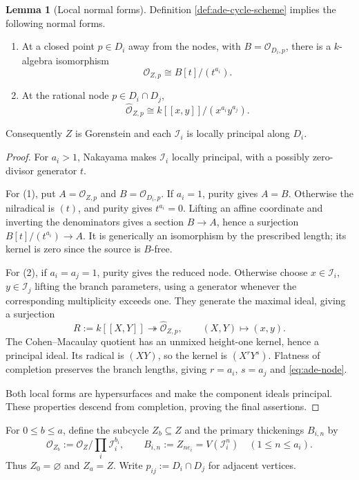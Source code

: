 \documentclass[a4paper,reqno]{amsart}
\def\I{\mathcal{I}}
\def\O{\mathcal{O}}
\theoremstyle{definition}
\newtheorem{Lem}[Thm]{Lemma}
\begin{document}
\begin{Lem}[Local normal forms]\label{lem:ade-local-structure}
Definition \ref{def:ade-cycle-scheme} implies the following normal forms.
\begin{enumerate}
\item At a closed point $p\in D_i$ away from the nodes, with $B=\O_{D_i,p}$, there is a $k$-algebra isomorphism
\[
\O_{Z,p}\cong B[t]/(t^{a_i}).
\]
\item At the rational node $p\in D_i\cap D_j$,
\begin{equation}\label{eq:ade-node}
\widehat{\O}_{Z,p}\cong k[[x,y]]/(x^{a_i}y^{a_j}).
\end{equation}
\end{enumerate}
Consequently $Z$ is Gorenstein and each $\I_i$ is locally principal along $D_i$.
\end{Lem}
\begin{proof}
For $a_i>1$, Nakayama makes $\I_i$ locally principal, with a possibly zero-divisor generator $t$.

For (1), put $A=\O_{Z,p}$ and $B=\O_{D_i,p}$. If $a_i=1$, purity gives $A=B$. Otherwise the nilradical is $(t)$, and purity gives $t^{a_i}=0$. Lifting an affine coordinate and inverting the denominators gives a section $B\to A$, hence a surjection $B[t]/(t^{a_i})\to A$. It is generically an isomorphism by the prescribed length; its kernel is zero since the source is $B$-free.

For (2), if $a_i=a_j=1$, purity gives the reduced node. Otherwise choose $x\in\I_i$, $y\in\I_j$ lifting the branch parameters, using a generator whenever the corresponding multiplicity exceeds one. They generate the maximal ideal, giving a surjection
\[
R:=k[[X,Y]]\twoheadrightarrow\widehat{\O}_{Z,p},
\qquad (X,Y)\longmapsto(x,y).
\]
The Cohen--Macaulay quotient has an unmixed height-one kernel, hence a principal ideal. Its radical is $(XY)$, so the kernel is $(X^rY^s)$. Flatness of completion preserves the branch lengths, giving $r=a_i$, $s=a_j$ and \eqref{eq:ade-node}.

Both local forms are hypersurfaces and make the component ideals principal. These properties descend from completion, proving the final assertions.
\end{proof}

For $0\le b\le a$, define the subcycle $Z_b\subseteq Z$ and the primary thickenings $B_{i,n}$ by
\[
\O_{Z_b}:=\O_Z\Big/\prod_i\I_i^{b_i},
\qquad B_{i,n}:=Z_{ne_i}=V(\I_i^n)\quad(1\le n\le a_i).
\]
Thus $Z_0=\varnothing$ and $Z_a=Z$. Write $p_{ij}:=D_i\cap D_j$ for adjacent vertices.
\end{document}
